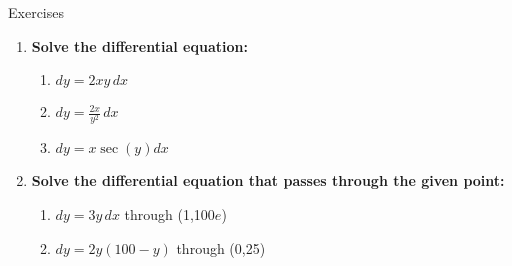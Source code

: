 \documentclass[../revisedmain.tex]{subfiles}
\begin{document}
\begin{center}
	\LARGE Exercises
\end{center}
\begin{enumerate}
	\item \textbf{Solve the differential equation:}
	\begin{enumerate}
		\item $dy=2xy\,dx$
		\item $dy=\frac{2x}{y^2}\,dx$
		\item $dy=x\sec(y)dx$
	\end{enumerate}
	\item \textbf{Solve the differential equation that passes through the given point:}
	\begin{enumerate}
		\item $dy=3y\,dx$ through (1,100$e$)
		\item $dy=2y(100-y)$ through (0,25)
	\end{enumerate}
\end{enumerate}
\end{document}
